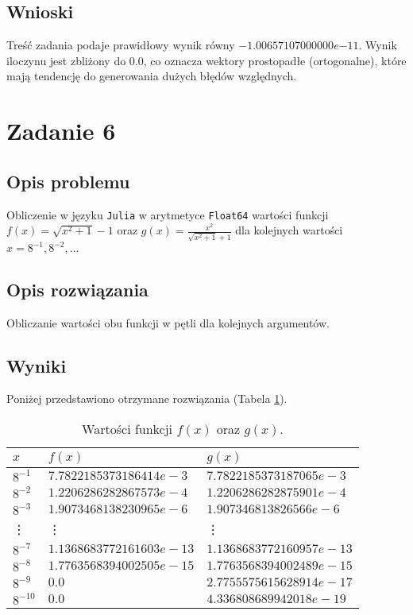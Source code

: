 \documentclass{classrep}
\begin{document}
	\subsection{Wnioski}
		Treść zadania podaje prawidłowy wynik równy $-1.00657107000000e{-11}$.
		Wynik iloczynu jest zbliżony do $0.0$, co oznacza wektory prostopadłe (ortogonalne), które mają tendencję do generowania dużych błędów
		względnych.
\section{Zadanie 6}
	\subsection{Opis problemu}
		Obliczenie w języku \texttt{Julia} w arytmetyce \texttt{Float64} wartości funkcji 
		$f(x)=\sqrt{x^2 + 1} - 1$ oraz $g(x)=\frac{x^2}{\sqrt{x^2+1}+1}$  dla kolejnych wartości 
		$x=8^{-1},8^{-2},\dots$
	\subsection{Opis rozwiązania}
		Obliczanie wartości obu funkcji w pętli dla kolejnych argumentów.
	\subsection{Wyniki}
		Poniżej przedstawiono otrzymane rozwiązania (Tabela \ref{table:9}).
		\begin{table}[h!]
        	\centering
        	\footnotesize
			\begin{tabular}{lll} \toprule
				$x$ & $f(x)$ & $g(x)$ \\ \midrule
				$8^{-1}$ & $7.7822185373186414e-3$ & $7.7822185373187065e-3$ \\ 
 				$8^{-2}$ & $1.2206286282867573e-4$ & $1.2206286282875901e-4$ \\
 				$8^{-3}$ & $1.9073468138230965e-6$ & $1.907346813826566e-6$ \\
 				\vdots & \vdots & \vdots \\
 				$8^{-7}$ & $1.1368683772161603e-13$ & $1.1368683772160957e-13$ \\
 				$8^{-8}$ & $1.7763568394002505e-15$ & $1.7763568394002489e-15$ \\
 				$8^{-9}$ & $0.0$ & $2.7755575615628914e-17$ \\
 				$8^{-10}$ & $0.0$ & $4.336808689942018e-19$ \\\bottomrule
 			\end{tabular}
 			\caption{Wartości funkcji $f(x)$ oraz $g(x)$.}
			\label{table:9}
		\end{table}
	
\end{document}

